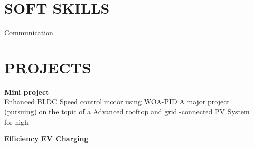 \documentclass[9.5pt,a4paper]{extarticle}
\begin{document}
\section*{SOFT SKILLS}
\noindent Communication \vspace{4pt}



\section*{PROJECTS}
\noindent \textbf{Mini project} \\
Enhanced BLDC Speed control motor using WOA-PID A major project (pursuing) on the topic of a Advanced rooftop and grid -connected PV System for high \vspace{4pt}

\noindent \textbf{Efficiency EV Charging} \\
\vspace{4pt}


\end{document}
